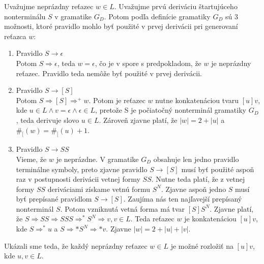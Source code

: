 \documentclass[10pt]{article}
\begin{document}
Uvažujme neprázdny reťazec $w \in L$. Uvažujme prvú deriváciu štartujúceho nonterminálu $S$ v
gramatike $G_D$. Potom podľa definície gramatiky $G_D$ sú 3 možnosti, ktoré pravidlo mohlo byť
použité v prvej derivácii pri generovaní reťazca $w$:
\begin{enumerate}
    \item Pravidlo $S \to \epsilon$\\
        Potom $S \Rightarrow \epsilon$, teda $w = \epsilon$, čo je v spore s predpokladom, že
        $w$ je neprázdny reťazec. Pravidlo teda nemôže byť použité v prvej derivácii.
    \item Pravidlo $S \to [S]$\\
        Potom $S \Rightarrow [S] \Rightarrow^+ w$. Potom je reťazec $w$ nutne konkatenáciou
        tvaru $[u]v$, kde $u \in L \land v = \epsilon \land \epsilon \in L$, pretože S je počiatočný nonterminál gramatiky $G_D$, teda derivuje
        slovo $u \in L$. Zároveň zjavne platí, že $|w| =  2+|u|$ a $\#_[(w) = \#_[(u) + 1$. 
    \item Pravidlo $S \to SS$\\
        Vieme, že $w$ je neprázdne. V gramatike $G_D$ obsahuje len jedno pravidlo terminálne symboly,
        preto zjavne pravidlo $S \to [S]$ musí byť použité aspoň raz v postupnosti derivácii vetnej
        formy $SS$. Nutne teda platí, že z vetnej formy $SS$ deriváciami získame vetnú formu $S^N$.
        Zjavne aspoň jedno $S$ musí byť prepísané pravidlom $S \to [S]$. Zaujíma nás ten najľavejší
        prepísaný nonterminál $S$. Potom vzniknutá vetná forma má tvar $[S]S^N$. Zjavne platí, že
        $S \Rightarrow SS \Rightarrow SSS \Rightarrow^* S^N \Rightarrow v, v \in L$. Teda reťazec $w$
        je konkatenáciou $[u]v$, kde $S\Rightarrow^*u$ a $S \Rightarrow* S^N \Rightarrow* v$. Zjavne
        $|w| = 2 + |u|+|v|$.
\end{enumerate}
Ukázali sme teda, že každý neprázdny reťazec $w \in L$ je možné rozložiť na $[u]v$, kde $u,v \in L$.
\end{document}
